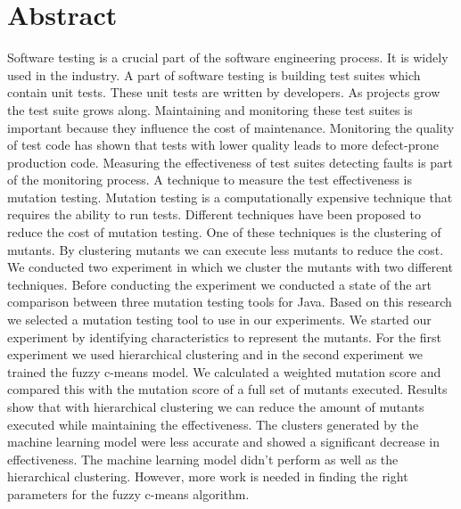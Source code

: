 \documentclass[../main]{subfiles}
\begin{document}
\chapter*{Abstract}
Software testing is a crucial part of the software engineering process. 
It is widely used in the industry.
A part of software testing is building test suites which contain unit tests.
These unit tests are written by developers. 
As projects grow the test suite grows along.
Maintaining and monitoring these test suites is important because they influence the cost of maintenance.
Monitoring the quality of test code has shown that tests with lower quality leads to more defect-prone production code.
\newline
Measuring the effectiveness of test suites detecting faults is part of the monitoring process.
A technique to measure the test effectiveness is mutation testing.
Mutation testing is a computationally expensive technique that requires the ability to run tests.
Different techniques have been proposed to reduce the cost of mutation testing.
One of these techniques is the clustering of mutants.
By clustering mutants we can execute less mutants to reduce the cost.
\newline
We conducted two experiment in which we cluster the mutants with two different techniques.
Before conducting the experiment we conducted a state of the art comparison between three mutation testing tools for Java.
Based on this research we selected a mutation testing tool to use in our experiments.
\newline
We started our experiment by identifying characteristics to represent the mutants.
For the first experiment we used hierarchical clustering and in the second experiment we trained the fuzzy c-means model.
We calculated a weighted mutation score and compared this with the mutation score of a full set of mutants executed.
Results show that with hierarchical clustering we can reduce the amount of mutants executed while maintaining the effectiveness.
The clusters generated by the machine learning model were less accurate and showed a significant decrease in effectiveness.
The machine learning model didn't perform as well as the hierarchical clustering.
However, more work is needed in finding the right parameters for the fuzzy c-means algorithm. 
\end{document}
